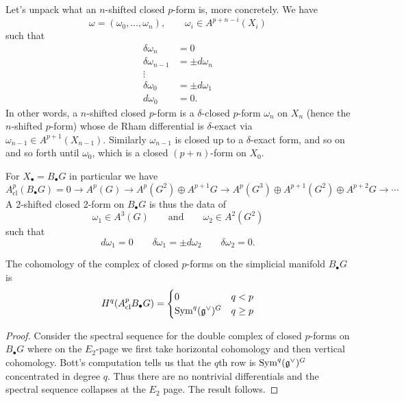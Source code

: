 \documentclass{amsart}
\begin{document}
Let's unpack what an $n$-shifted closed $p$-form is, more concretely.
We have
\begin{equation*}
    \omega = (\omega_0, \ldots, \omega_n), \qquad \omega_i\in 
    A^{p+n-i}(X_i)
\end{equation*}
such that
\begin{align*}
    \delta\omega_n &= 0 \\
    \delta\omega_{n-1} &= \pm d\omega_n \\
    \vdots & \\
    \delta\omega_0 &= \pm d\omega_1 \\
    d\omega_0 &=0.
\end{align*}
In other words, a $n$-shifted closed $p$-form is a $\delta$-closed $p$-form
$\omega_n$ on $X_n$ (hence the $n$-shifted $p$-form) whose de Rham differential 
is $\delta$-exact via $\omega_{n-1}\in A^{p+1}(X_{n-1})$. Similarly 
$\omega_{n-1}$ is closed up to a $\delta$-exact form, and so on and so forth 
until $\omega_0$, which is a closed $(p+n)$-form on $X_0$.

\begin{example}
    For $X_\bullet = B_\bullet G$ in particular we have
    \begin{equation*}
        A^p_\text{cl}(B_\bullet G) = 0 \to A^p(G) \to A^p(G^2)\oplus 
        A^{p+1}G \to A^p(G^3)\oplus A^{p+1}(G^2)\oplus A^{p+2}G \to \cdots
    \end{equation*}
    A 2-shifted closed 2-form on $B_\bullet G$ is thus the data of
    \begin{equation*}
        \omega_1\in A^3(G) \qquad \text{and} \qquad \omega_2\in A^2(G^2)
    \end{equation*}
    such that
    \begin{equation*}
        d\omega_1 = 0 \qquad \delta\omega_1 = \pm d\omega_2 \qquad 
        \delta\omega_2=0.
    \end{equation*}
\end{example}

\begin{proposition}
    The cohomology of the complex of closed $p$-forms on the simplicial manifold 
    $B_\bullet G$ is
    \begin{equation*}
        H^q(A^p_\text{cl}B_\bullet G) =
        \begin{cases}
            0 & q < p \\
            \operatorname{Sym}^q(\mathfrak g^\vee)^G & q\geq p
        \end{cases}
    \end{equation*}
\end{proposition}
\begin{proof}
    Consider the spectral sequence for the double complex of closed $p$-forms on 
    $B_\bullet G$ where on the $E_2$-page we first take horizontal cohomology and
    then vertical cohomology. Bott's computation tells us that the $q$th row is 
    $\operatorname{Sym}^q(\mathfrak g^\vee)^G$ concentrated in degree $q$. Thus there are no 
    nontrivial differentials and the spectral sequence collapses at the $E_2$ 
    page. The result follows.
\end{proof}
\end{document}
